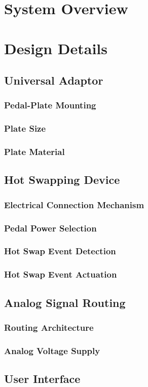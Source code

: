 \section{System Overview}

\section{Design Details}
	\subsection{Universal Adaptor}
		\subsubsection{Pedal-Plate Mounting}
		\subsubsection{Plate Size}
		\subsubsection{Plate Material}
	\subsection{Hot Swapping Device}
		\subsubsection{Electrical Connection Mechanism}
		\subsubsection{Pedal Power Selection}
		\subsubsection{Hot Swap Event Detection}
		\subsubsection{Hot Swap Event Actuation}
	\subsection{Analog Signal Routing}
		\subsubsection{Routing Architecture}
		\subsubsection{Analog Voltage Supply}
	\subsection{User Interface}
